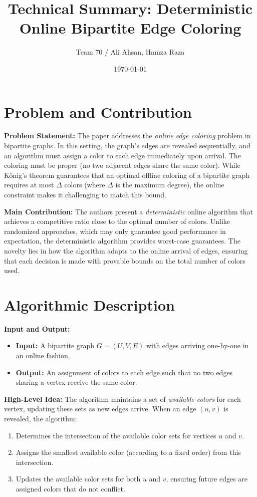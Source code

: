 \documentclass[11pt]{article}
\title{Technical Summary: Deterministic Online Bipartite Edge Coloring}
\author{Team 70 / Ali Ahsan, Hamza Raza}
\date{\today}
\begin{document}
\maketitle

\section{Problem and Contribution}
\textbf{Problem Statement:}  
The paper addresses the \emph{online edge coloring} problem in bipartite graphs. In this setting, the graph’s edges are revealed sequentially, and an algorithm must assign a color to each edge immediately upon arrival. The coloring must be proper (no two adjacent edges share the same color). While Kőnig’s theorem guarantees that an optimal offline coloring of a bipartite graph requires at most $\Delta$ colors (where $\Delta$ is the maximum degree), the online constraint makes it challenging to match this bound.

\textbf{Main Contribution:}  
The authors present a \emph{deterministic} online algorithm that achieves a competitive ratio close to the optimal number of colors. Unlike randomized approaches, which may only guarantee good performance in expectation, the deterministic algorithm provides worst-case guarantees. The novelty lies in how the algorithm adapts to the online arrival of edges, ensuring that each decision is made with provable bounds on the total number of colors used.

\section{Algorithmic Description}
\textbf{Input and Output:}  
\begin{itemize}[noitemsep]
    \item \textbf{Input:} A bipartite graph \(G=(U,V,E)\) with edges arriving one-by-one in an online fashion.
    \item \textbf{Output:} An assignment of colors to each edge such that no two edges sharing a vertex receive the same color.
\end{itemize}

\textbf{High-Level Idea:}  
The algorithm maintains a set of \emph{available colors} for each vertex, updating these sets as new edges arrive. When an edge \((u,v)\) is revealed, the algorithm:
\begin{enumerate}[noitemsep]
    \item Determines the intersection of the available color sets for vertices \(u\) and \(v\).
    \item Assigns the smallest available color (according to a fixed order) from this intersection.
    \item Updates the available color sets for both \(u\) and \(v\), ensuring future edges are assigned colors that do not conflict.
\end{enumerate}
\end{document}
